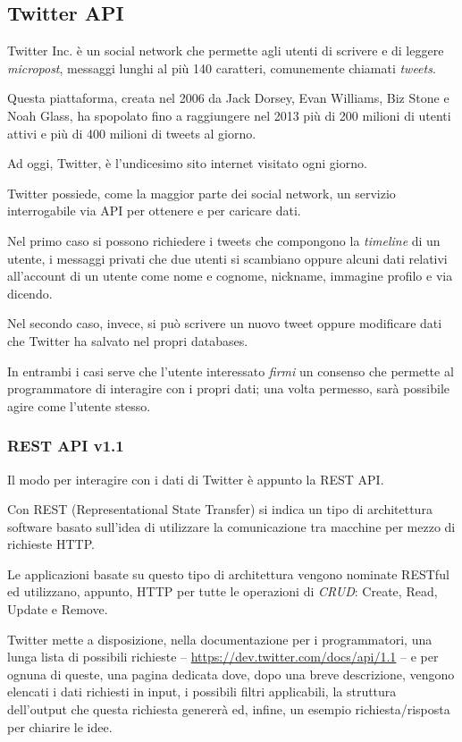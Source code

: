 \subsection{Twitter API}
	Twitter Inc. è un social network che permette agli utenti di scrivere e di leggere \emph{micropost}, messaggi lunghi al più 140 caratteri, comunemente chiamati \emph{tweets}. 

	Questa piattaforma, creata nel 2006 da Jack Dorsey, Evan Williams, Biz Stone e Noah Glass, ha spopolato fino a raggiungere nel 2013 più di 200 milioni di utenti attivi e più di 400 milioni di tweets al giorno\cite{twitter_data}.

	Ad oggi, Twitter, è l'undicesimo sito internet visitato ogni giorno\cite{twitter_alexa}.

	Twitter possiede, come la maggior parte dei social network, un servizio interrogabile via API per ottenere e per caricare dati.

	Nel primo caso si possono richiedere i tweets che compongono la \emph{timeline} di un utente, i messaggi privati che due utenti si scambiano oppure alcuni dati relativi all'account di un utente come nome e cognome, nickname, immagine profilo e via dicendo.

	Nel secondo caso, invece, si può scrivere un nuovo tweet oppure modificare dati che Twitter ha salvato nel propri databases. 

	In entrambi i casi serve che l'utente interessato \emph{firmi} un consenso che permette al programmatore di interagire con i propri dati; una volta permesso, sarà possibile agire come l'utente stesso. 

	\subsubsection{REST API v1.1}
		Il modo per interagire con i dati di Twitter è appunto la REST API. 
	
		Con REST (Representational State Transfer) si indica un tipo di architettura software basato sull'idea di utilizzare la comunicazione tra macchine per mezzo di richieste HTTP.

		Le applicazioni basate su questo tipo di architettura vengono nominate RESTful ed utilizzano, appunto, HTTP per tutte le operazioni di \emph{CRUD}: Create, Read, Update e Remove.

		Twitter mette a disposizione, nella documentazione per i programmatori\cite{twitter_doc}, una lunga lista di possibili richieste -- \url{https://dev.twitter.com/docs/api/1.1} -- e per ognuna di queste, una pagina dedicata dove, dopo una breve descrizione, vengono elencati i dati richiesti in input, i possibili filtri applicabili, la struttura dell'output che questa richiesta genererà ed, infine, un esempio richiesta/risposta per chiarire le idee.

